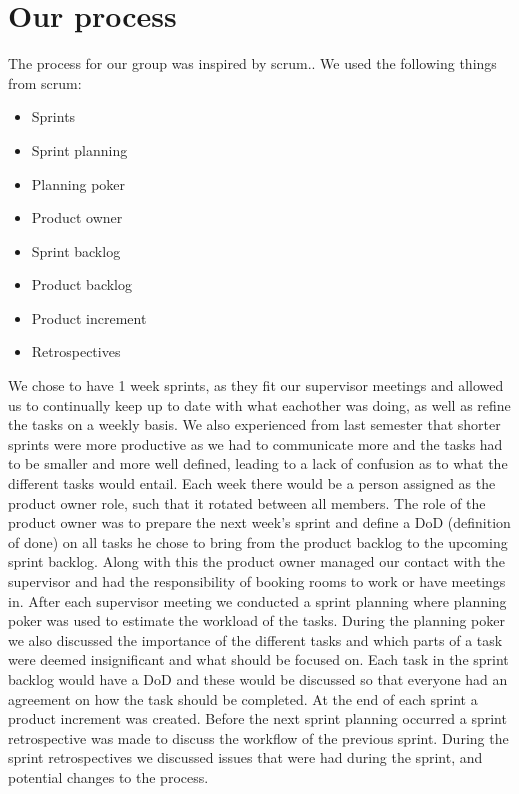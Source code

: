 \section{Our process}
The process for our group was inspired by scrum.. We used the following things from scrum:

\begin{itemize}
    \item Sprints 
    \item Sprint planning 
    \item Planning poker 
    \item Product owner 
    \item Sprint backlog 
    \item Product backlog   
    \item Product increment 
    \item Retrospectives 
\end{itemize}

\noindent
We chose to have 1 week sprints, as they fit our supervisor meetings and allowed us to continually keep up to date with what eachother was doing, as well as refine the tasks on a weekly basis.
We also experienced from last semester that shorter sprints were more productive as we had to communicate more and the tasks had to be smaller and more well defined, leading to a lack of confusion as to what the different tasks would entail. 
Each week there would be a person assigned as the product owner role, such that it rotated between all members.
The role of the product owner was to prepare the next week's sprint and define a DoD (definition of done) on all tasks he chose to bring from the product backlog to the upcoming sprint backlog.
Along with this the product owner managed our contact with the supervisor and had the responsibility of booking rooms to work or have meetings in.
After each supervisor meeting we conducted a sprint planning where planning poker was used to estimate the workload of the tasks.
During the planning poker we also discussed the importance of the different tasks and which parts of a task were deemed insignificant and what should be focused on.
Each task in the sprint backlog would have a DoD and these would be discussed so that everyone had an agreement on how the task should be completed.
At the end of each sprint a product increment was created. 
Before the next sprint planning occurred a sprint retrospective was made to discuss the workflow of the previous sprint.
During the sprint retrospectives we discussed issues that were had during the sprint, and potential changes to the process.
